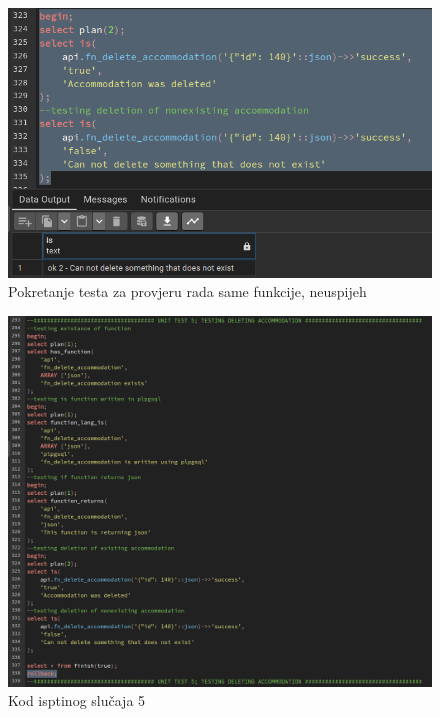 				\begin{figure}[H]
					\centering
					\includegraphics[width=\textwidth]{slike/unit_tests/ut_5/failure_invocation.png}
					\caption{Pokretanje testa za provjeru rada same funkcije, neuspijeh}
					\label{fig: IS5-smještaj je već izbrisan ili ne postoji}
				\end{figure}
				\begin{figure}[H]
					\centering
					\includegraphics[width=\textwidth]{slike/unit_tests/ut_5/code.png}
					\caption{Kod isptinog slučaja 5}
					\label{fig: IS5-kod}
				\end{figure}
				\eject
